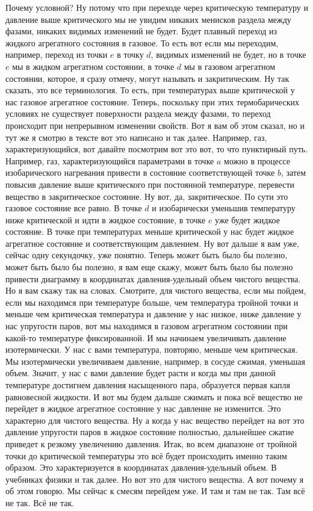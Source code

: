 \documentclass[main.tex]{subfiles}
\begin{document}
Почему условной?
Ну потому что при переходе через критическую температуру и давление выше критического мы не увидим никаких менисков раздела между фазами, никаких видимых изменений не будет.
Будет плавный переход из жидкого агрегатного состояния в газовое.
То есть вот если мы переходим, например, переход из точки $e$ в точку $d$, видимых изменений не будет, но в точке $e$ мы
в жидком агрегатном состоянии, в точке $d$ мы в газовом агрегатном
состоянии, которое, я сразу отмечу, могут называть и закритическим.
Ну так сказать, это все терминология.
То есть, при температурах выше критической у нас газовое агрегатное состояние.
Теперь, поскольку при этих термобарических условиях не существует поверхности раздела между фазами, то переход происходит при непрерывном изменении свойств.
Вот я вам об этом сказал, но и тут же я смотрю в тексте вот это написано и так далее.
Например, газ, характеризующийся, вот давайте посмотрим вот это вот, то что пунктирный путь.
Например, газ, характеризующийся параметрами в точке $a$ можно в процессе изобарического нагревания привести в состояние соответствующей точке $b$, затем повысив давление выше критического при постоянной температуре, перевести вещество в закритическое состояние.
Ну вот, да, закритическое.
По сути это газовое состояние все равно.
В точке $d$ и изобарически уменьшив температуру ниже критической и идти в жидкое состояние, в точке $e$ уже будет жидкое состояние.
В точке при температурах меньше критической у нас будет жидкое агрегатное состояние и соответствующим давлением.
Ну вот дальше я вам уже, сейчас одну секундочку, уже понятно.
Теперь может быть было бы полезно, может быть было бы полезно, я вам еще скажу, может быть было бы полезно привести диаграмму в координатах давления-удельный объем чистого вещества.
Но я вам скажу так на словах.
Смотрите, для чистого вещества, если мы пойдем, если мы находимся при температуре больше, чем температура тройной точки и меньше чем критическая температура и давление у нас низкое, ниже давление у нас упругости паров, вот мы находимся в газовом агрегатном состоянии
при какой-то температуре фиксированной.
И мы начинаем увеличивать давление изотермически.
У нас с вами температура, повторяю, меньше чем критическая.
Мы изотермически увеличиваем давление, например, в сосуде сжимая, уменьшая объем.
Значит, у нас с вами давление будет расти и когда мы при данной температуре достигнем давления насыщенного пара, образуется первая капля равновесной жидкости.
И вот мы будем дальше сжимать и пока всё вещество не перейдет в жидкое агрегатное состояние у нас давление не изменится.
Это характерно для чистого вещества.
Ну а когда у нас вещество перейдет на вот это давление упругости паров в жидкое состояние полностью, дальнейшее сжатие приведет к резкому увеличению давления.
Итак, во всем диапазоне от тройной точки до критической температуры это всё будет происходить именно таким образом.
Это характеризуется в координатах давления-удельный объем.
В учебниках физики и так далее.
Но вот это для чистого вещества.
А вот почему я об этом говорю.
Мы сейчас к смесям перейдем уже.
И там и там не так.
Там всё не так.
Всё не так.
\end{document}
